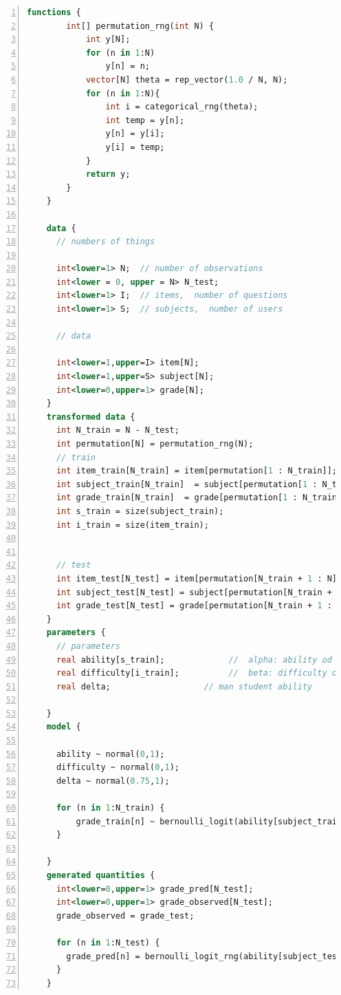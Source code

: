 \begin{lstlisting}[language=Stan,caption={Code Stan pour le modèle de Rasch avec cross-validation},basicstyle=\scriptsize, frame=lines,framesep=4.5mm,framexleftmargin=2.5mm,tabsize=2,numbers=left,fillcolor=\color{white},rulecolor=\color{black},numberstyle=\normalfont\scriptsize\color{black}]
    functions {
        int[] permutation_rng(int N) {
            int y[N];
            for (n in 1:N)
                y[n] = n;
            vector[N] theta = rep_vector(1.0 / N, N);
            for (n in 1:N){
                int i = categorical_rng(theta);
                int temp = y[n];
                y[n] = y[i];
                y[i] = temp;
            }
            return y;
        }
    }
    
    data {
      // numbers of things
      
      int<lower=1> N;  // number of observations
      int<lower = 0, upper = N> N_test;
      int<lower=1> I;  // items,  number of questions  
      int<lower=1> S;  // subjects,  number of users
      
      // data
      
      int<lower=1,upper=I> item[N];
      int<lower=1,upper=S> subject[N];
      int<lower=0,upper=1> grade[N];
    }
    transformed data {
      int N_train = N - N_test;
      int permutation[N] = permutation_rng(N);
      // train
      int item_train[N_train] = item[permutation[1 : N_train]];
      int subject_train[N_train]  = subject[permutation[1 : N_train]];
      int grade_train[N_train]  = grade[permutation[1 : N_train]];
      int s_train = size(subject_train);
      int i_train = size(item_train);
      
      
      // test
      int item_test[N_test] = item[permutation[N_train + 1 : N]];
      int subject_test[N_test] = subject[permutation[N_train + 1 : N]];
      int grade_test[N_test] = grade[permutation[N_train + 1 : N]];
    }
    parameters {
      // parameters
      real ability[s_train];             //  alpha: ability od student
      real difficulty[i_train];          //  beta: difficulty of question
      real delta;                   // man student ability
      
    }
    model {
    
      ability ~ normal(0,1);         
      difficulty ~ normal(0,1);   
      delta ~ normal(0.75,1);
      
      for (n in 1:N_train) {
          grade_train[n] ~ bernoulli_logit(ability[subject_train[n]] - difficulty[item_train[n]] + delta);
      }
      
    }
    generated quantities {
      int<lower=0,upper=1> grade_pred[N_test];
      int<lower=0,upper=1> grade_observed[N_test];
      grade_observed = grade_test;
      
      for (n in 1:N_test) {
        grade_pred[n] = bernoulli_logit_rng(ability[subject_test[n]] - difficulty[item_test[n]] + delta);
      }
    }
\end{lstlisting}

